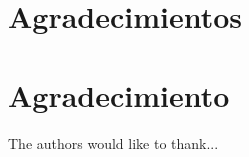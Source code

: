 \documentclass[conference,compsoc]{sty/IEEEtran}
\begin{document}



\ifCLASSOPTIONcompsoc
  \section*{Agradecimientos}
\else
  \section*{Agradecimiento}
\fi


The authors would like to thank...



\end{document}
